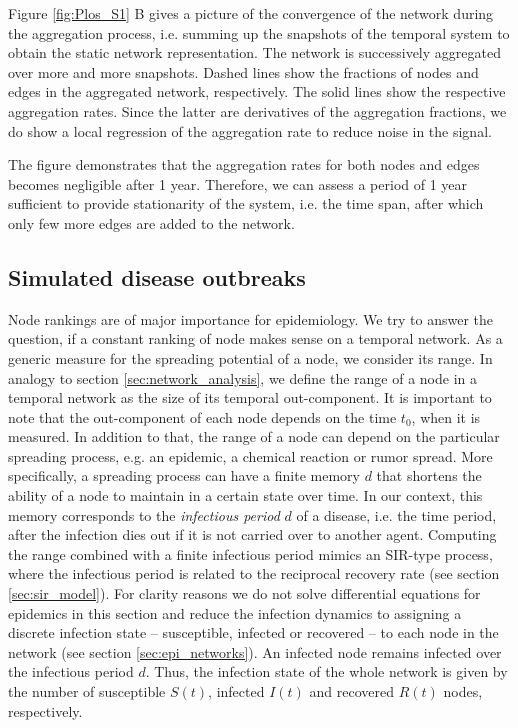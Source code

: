 Figure \ref{fig:Plos_S1} B gives a picture of the convergence of the network during the aggregation process, i.e. summing up the snapshots of the temporal system to obtain the static network representation.
The network is successively aggregated over more and more snapshots.
Dashed lines show the fractions of nodes and edges in the aggregated network, respectively.
The solid lines show the respective aggregation rates.
Since the latter are derivatives of the aggregation fractions, we do show a local regression of the aggregation rate to reduce noise in the signal.

The figure demonstrates that the aggregation rates for both nodes and edges becomes negligible after 1 year.
Therefore, we can assess a period of 1 year sufficient to provide stationarity of the system, i.e. the time span, after which only few more edges are added to the network.

\subsection{Simulated disease outbreaks}
Node rankings are of major importance for epidemiology.
We try to answer the question, if a constant ranking of node makes sense on a temporal network.
As a generic measure for the spreading potential of a node, we consider its range.
In analogy to section \ref{sec:network_analysis}, we define the range of a node in a temporal network as the size of its temporal out-component.
It is important to note that the out-component of each node depends on the time $t_0$, when it is measured.
In addition to that, the range of a node can depend on the particular spreading process, e.g. an epidemic, a chemical reaction or rumor spread.
More specifically, a spreading process can have a finite memory $d$ that shortens the ability of a node to maintain in a certain state over time.
In our context, this memory corresponds to the \emph{infectious period} $d$ of a disease, i.e. the time period, after the infection dies out if it is not carried over to another agent.
Computing the range combined with a finite infectious period mimics an SIR-type process, where the infectious period is related to the reciprocal recovery rate (see section \ref{sec:sir_model}).
For clarity reasons we do not solve differential equations for epidemics in this section and reduce the infection dynamics to assigning a discrete infection state -- susceptible, infected or recovered -- to each node in the network (see section \ref{sec:epi_networks}).
An infected node remains infected over the infectious period $d$.
Thus, the infection state of the whole network is given by the number of susceptible $S(t)$, infected $I(t)$ and recovered $R(t)$ nodes, respectively.


